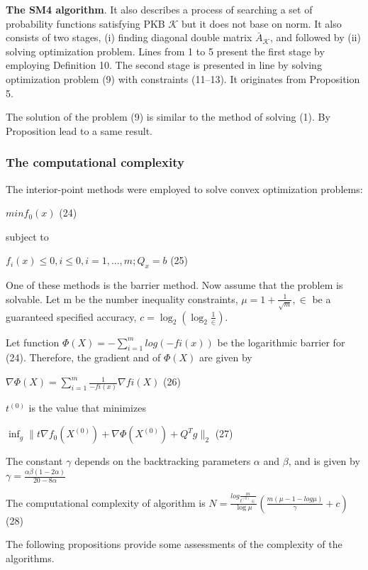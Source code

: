 \documentclass[]{iosart2c}
\begin{document}
  \textbf{The SM4 algorithm}. It also describes a process of searching a set of probability functions satisfying PKB $\mathcal{K}$ but it does not base on norm. It also consists of two stages, (i) finding diagonal double matrix $\bar{A}_\mathcal{K}$, and followed by (ii) solving optimization problem. Lines from 1 to 5 present the first stage by employing Definition 10. The second stage is presented in line by solving optimization problem (9) with constraints (11–13). It originates from Proposition 5.

  The solution of the problem (9) is similar to the method of solving (1). By Proposition lead to a same result.

  \subsubsection{The computational complexity}
  The interior-point methods \cite{29} were employed to
  solve convex optimization problems:

  $min f_0(x)$ (24)

  subject to

  $f_i(x) \le 0, i \le 0, i = 1, ...,m;Q_x = b$ (25)

  One of these methods is the barrier method. Now assume that the problem is solvable. Let m be the number inequality constraints, $\mu = 1 + \frac{1}{\sqrt{m}}, \in$ be a
  guaranteed specified accuracy, $c = \log_2 (\log_2 \frac{1}{\in})$.

  Let function $\Phi(X) = -\sum^m_{i=1} log(-fi(x))$ be the
  logarithmic barrier for (24). Therefore, the gradient
  and of $\Phi(X)$ are given by

  $\nabla \Phi(X) = \sum^m_{i=1} \frac{1}{-fi(x)} \nabla fi(X)$ (26)

  $t^{(0)}$ is the value that minimizes

  $\inf_g \parallel t\nabla f_0 \left( X^{(0)} \right) + \nabla \Phi \left( X^{(0)} \right) + Q^T g \parallel _2$ (27)

  The constant $\gamma$ depends on the backtracking
  parameters $\alpha$ and $\beta$, and is given by $\gamma =  \frac{\alpha\beta(1-2\alpha)}{20-8\alpha}$

  The computational complexity of algorithm is
  $N = \frac{log \frac{m}{t^{(0)} \in}}{ \log\mu }
  \left( \frac{m(\mu - 1 - log\mu)}{\gamma} + c \right)$ (28)

  The following propositions provide some assessments of the complexity of the algorithms.
\end{document}
